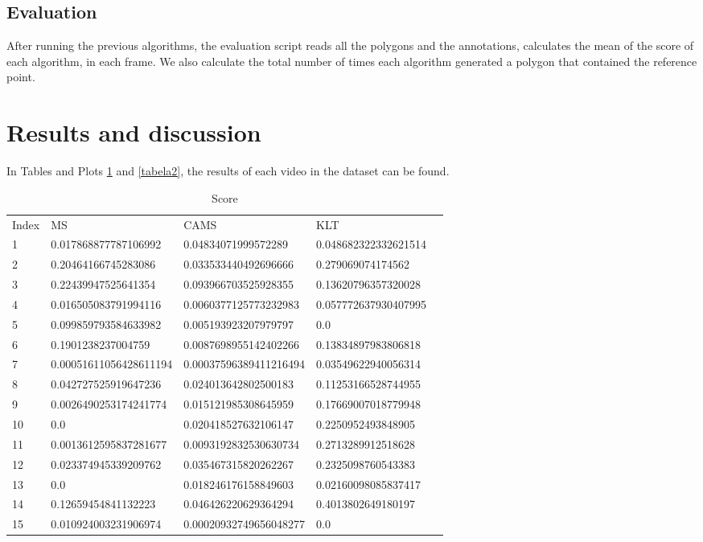 \documentclass[a4paper]{article}
\begin{document}
\subsection{Evaluation}
After running the previous algorithms, the evaluation script reads all the polygons and the annotations, calculates the mean of the score of each algorithm, in each frame. We also calculate the total number of times each algorithm generated a polygon that contained the reference point.


\section{Results and discussion}

In Tables and Plots \ref{tabela1} and \ref{tabela2}, the results of each video in the dataset can be found.

\begin{table}[h]
\centering
\caption{Score}
\label{tabela1}
\begin{tabular}{|l|l|l|l|l}
\cline{1-4}
Index  & MS   & CAMS    & KLT &  \\ \cline{1-4}
1  & 0.017868877787106992   & 0.04834071999572289    & 0.048682322332621514 &  \\ \cline{1-4}
2  & 0.20464166745283086    & 0.033533440492696666   & 0.279069074174562    &  \\ \cline{1-4}
3  & 0.22439947525641354    & 0.093966703525928355   & 0.13620796357320028  &  \\ \cline{1-4}
4  & 0.016505083791994116   & 0.0060377125773232983  & 0.057772637930407995 &  \\ \cline{1-4}
5  & 0.099859793584633982   & 0.005193923207979797   & 0.0                  &  \\ \cline{1-4}
6  & 0.1901238237004759     & 0.0087698955142402266  & 0.13834897983806818  &  \\ \cline{1-4}
7  & 0.00051611056428611194 & 0.00037596389411216494 & 0.03549622940056314  &  \\ \cline{1-4}
8  & 0.042727525919647236   & 0.024013642802500183   & 0.11253166528744955  &  \\ \cline{1-4}
9  & 0.0026490253174241774  & 0.015121985308645959   & 0.17669007018779948  &  \\ \cline{1-4}
10 & 0.0                    & 0.020418527632106147   & 0.2250952493848905   &  \\ \cline{1-4}
11 & 0.0013612595837281677  & 0.0093192832530630734  & 0.2713289912518628   &  \\ \cline{1-4}
12 & 0.023374945339209762   & 0.035467315820262267   & 0.2325098760543383   &  \\ \cline{1-4}
13 & 0.0                    & 0.018246176158849603   & 0.02160098085837417  &  \\ \cline{1-4}
14 & 0.12659454841132223    & 0.046426220629364294   & 0.4013802649180197   &  \\ \cline{1-4}
15 & 0.010924003231906974   & 0.00020932749656048277 & 0.0                  &  \\ \cline{1-4}
\end{tabular}
\end{table}
\end{document}
